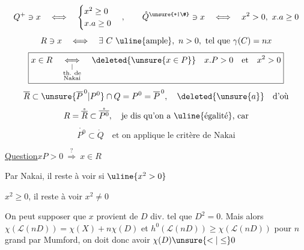 \[Q^+\ni x\quad\Longleftrightarrow\quad\begin{cases}x^2\geq0\\x.a\geq0\end{cases},\qquad
\mathring Q^{\unsure{+|\#}}\ni x\quad\Longleftrightarrow\quad x^2>0,\ x.a\geq0\]
\margin{$[a$ choisi dans $\unsure{\mathring Q^{+}|Q^+}]$ p.ex $a$ dans $R\ ]$}
\[R\ni x\quad\Longleftrightarrow\quad\exists\ C\ \uline{\text{ample}},\ n>0,\ \text{tel que }\gamma(C)=nx\]
\hrulefill
\[\boxed{x\in R\quad\underset{\substack{\vert\\\text{th. de}\\\text{Nakai}}}{\Longleftrightarrow}\quad\deleted{\unsure{x\in P}}\quad x.P>0\quad\text{et}\quad x^2>0}\]
\[\overline R\subset\unsure{\overline P^{\,0}|P^0}\cap Q=P^0=\overline P^{\,0},\quad\deleted{\unsure{a}}\quad\text{d'où}\]
\[R=\mathring{\overline R}\subset\mathring{\overline{P^0}},\quad\text{je dis qu'on a \uline{égalité}, car}\]
\[\mathring{P^0}\subset\mathring Q\quad\text{et on applique le critère de Nakai}\]

\uline{Question}\quad $xP>0\ \overset{?}{\Longrightarrow}\ x\in R$

Par Nakai, il reste à voir si $\uline{x^2>0}$

 $x^2\geq0$, il reste à voir $x^2\neq0$

On peut supposer que $x$ provient de $D$ div. tel que $D^2=0$. Mais alors $\chi(\mathcal L(nD))=\chi(X)+n\chi(D)$ et $h^0(\mathcal L(nD))\geq\chi(\mathcal L(nD))$ pour $n$ grand par Mumford, on doit donc avoir $\chi(D)\unsure{<|\leq}0$

